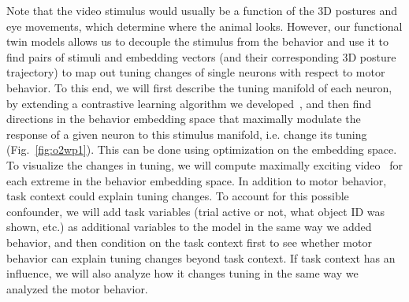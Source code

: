 \documentclass[B2,COG]{ercgrant}
\begin{document}
Note that the video stimulus would usually be a function of the 3D postures and eye movements, which determine where the animal looks. 
However, our functional twin models allows us to decouple the stimulus from the behavior and use it to find pairs of stimuli and embedding vectors (and their corresponding 3D posture trajectory) to map out tuning changes of single neurons with respect to motor behavior. 
To this end, we will first describe the tuning manifold of each neuron, by extending a contrastive learning algorithm we developed~\parencite{Baroni2022-fi}, and then find directions in the behavior embedding space that maximally modulate the response of a given neuron to this stimulus manifold, i.e. change its tuning (Fig.~\ref{fig:o2wp1}).
This can be done using optimization on the embedding space. 
To visualize the changes in tuning, we will compute maximally exciting video~\parencite[MEIs][]{Walker2019-yw} for each extreme in the behavior embedding space. 
In addition to motor behavior, task context could explain tuning changes. 
To account for this possible confounder, we will add task variables (trial active or not, what object ID was shown, etc.) as additional variables to the model in the same way we added behavior, and then condition on the task context first to see whether motor behavior can explain tuning changes beyond task context. 
If task context has an influence, we will also analyze how it changes tuning in the same way we analyzed the motor behavior. 
\end{document}
